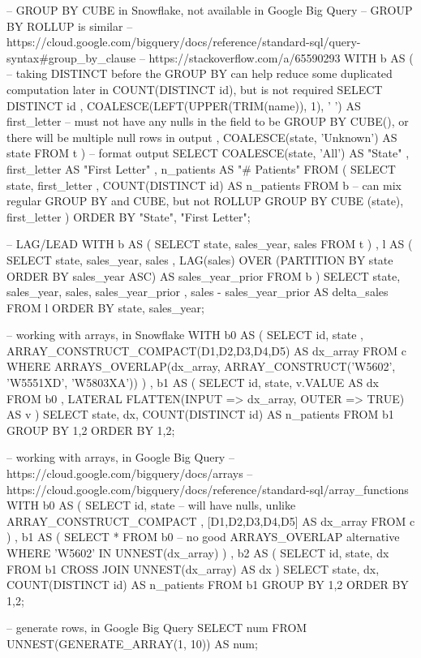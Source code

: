 \begin{SQLcode}
-- GROUP BY CUBE in Snowflake, not available in Google Big Query
-- GROUP BY ROLLUP is similar
-- https://cloud.google.com/bigquery/docs/reference/standard-sql/query-syntax#group_by_clause
-- https://stackoverflow.com/a/65590293
WITH b AS (
	-- taking DISTINCT before the GROUP BY can help reduce some duplicated computation later in COUNT(DISTINCT id), but is not required
	SELECT DISTINCT id
		, COALESCE(LEFT(UPPER(TRIM(name)), 1), ' ') AS first_letter
		-- must not have any nulls in the field to be GROUP BY CUBE(), or there will be multiple null rows in output
		, COALESCE(state, 'Unknown') AS state
	FROM t
)
-- format output
SELECT COALESCE(state, 'All') AS "State"
	, first_letter AS "First Letter"
	, n_patients AS "# Patients"
FROM (
	SELECT state, first_letter
		, COUNT(DISTINCT id) AS n_patients
	FROM b
	-- can mix regular GROUP BY and CUBE, but not ROLLUP
	GROUP BY CUBE (state), first_letter
)
ORDER BY "State", "First Letter";

-- LAG/LEAD
WITH b AS (
    SELECT state, sales_year, sales
    FROM t
)
, l AS (
    SELECT state, sales_year, sales
		, LAG(sales) OVER (PARTITION BY state ORDER BY sales_year ASC) AS sales_year_prior
    FROM b
)
SELECT state, sales_year, sales, sales_year_prior
	, sales - sales_year_prior AS delta_sales
FROM l
ORDER BY state, sales_year;

-- working with arrays, in Snowflake
WITH b0 AS (
	SELECT id, state
		, ARRAY_CONSTRUCT_COMPACT(D1,D2,D3,D4,D5) AS dx_array
	FROM c
	WHERE ARRAYS_OVERLAP(dx_array, ARRAY_CONSTRUCT('W5602', 'W5551XD', 'W5803XA'))
)
, b1 AS (
	SELECT id, state, v.VALUE AS dx
	FROM b0
	, LATERAL FLATTEN(INPUT => dx_array, OUTER => TRUE) AS v
)
SELECT state, dx, COUNT(DISTINCT id) AS n_patients
FROM b1
GROUP BY 1,2
ORDER BY 1,2;

-- working with arrays, in Google Big Query
-- https://cloud.google.com/bigquery/docs/arrays
-- https://cloud.google.com/bigquery/docs/reference/standard-sql/array_functions
WITH b0 AS (
	SELECT id, state
		-- will have nulls, unlike ARRAY_CONSTRUCT_COMPACT
		, [D1,D2,D3,D4,D5] AS dx_array
	FROM c
)
, b1 AS (
	SELECT *
	FROM b0
	-- no good ARRAYS_OVERLAP alternative
	WHERE 'W5602' IN UNNEST(dx_array)
)
, b2 AS (
	SELECT id, state, dx
	FROM b1
	CROSS JOIN UNNEST(dx_array) AS dx
)
SELECT state, dx, COUNT(DISTINCT id) AS n_patients
FROM b1
GROUP BY 1,2
ORDER BY 1,2;

-- generate rows, in Google Big Query
SELECT num
FROM UNNEST(GENERATE_ARRAY(1, 10)) AS num;
\end{SQLcode}

